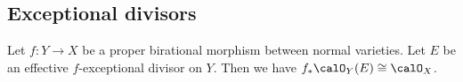\subsection{Exceptional divisors}

    \begin{proposition}\label{prop:pushout_of_O_X_E_with_E_effective_exceptional_along_birational_morphism}
        Let \(f: Y \to X\) be a proper birational morphism between normal varieties.
        Let \(E\) be an effective \(f\)-exceptional divisor on \(Y\).
        Then we have \(f_* \calO_Y(E) \cong \calO_X\).
    \end{proposition}

    
